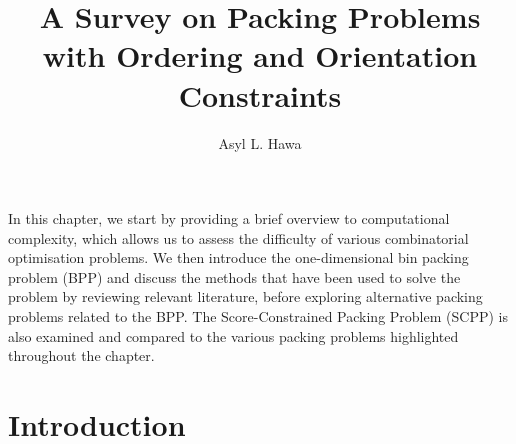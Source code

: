 \documentclass[a4paper,11pt]{article}
\begin{document}
	
\title{A Survey on Packing Problems with Ordering and Orientation Constraints}
\author{Asyl L. Hawa}
\date{}
\maketitle
		
\noindent In this chapter, we start by providing a brief overview to computational complexity, which allows us to assess the difficulty of various combinatorial optimisation problems. We then introduce the one-dimensional bin packing problem (BPP) and discuss the methods that have been used to solve the problem by reviewing relevant literature, before exploring alternative packing problems related to the BPP. The Score-Constrained Packing Problem (SCPP) is also examined and compared to the various packing problems highlighted throughout the chapter.

\section{Introduction}
\label{sec:intro}

\end{document}
